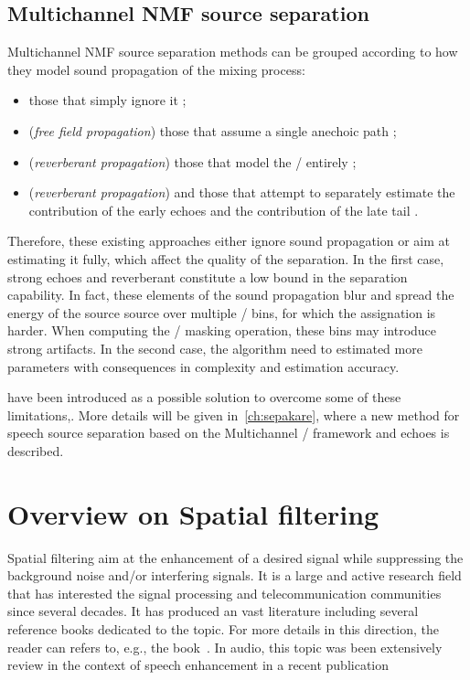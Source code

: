 \subsection{Multichannel NMF source separation}
Multichannel NMF source separation methods can be grouped according to how they model sound propagation of the mixing process:
\begin{itemize}
    \item those that simply ignore it ;
    \item (\textit{free field propagation}) those that assume a single anechoic path  ;
    \item (\textit{reverberant propagation}) those that model the \RTFs/ entirely ;
    \item (\textit{reverberant propagation}) and those that attempt to separately estimate the contribution of the early echoes and the contribution of the late tail .
\end{itemize}
Therefore, these existing approaches either ignore sound propagation or aim at estimating it fully, which affect the quality of the separation.
In the first case, strong echoes and reverberant constitute a low bound in the separation capability.
In fact, these elements of the sound propagation blur and spread the energy of the source source over multiple \TF/ bins, for which the assignation is harder.
When computing the \TF/ masking operation, these bins may introduce strong artifacts.
In the second case, the algorithm need to estimated more parameters with consequences in complexity and estimation accuracy.

 have been introduced as a possible solution to overcome some of these limitations,.
More details will be given in~\cref{ch:sepakare}, where a new method for speech source separation based on the Multichannel \NMF/ framework and echoes is described.

\section{Overview on Spatial filtering}\label{subsec:application:filtering}
Spatial filtering aim at the enhancement of a desired signal while suppressing the background noise and/or interfering signals.
It is a large and active research field that has interested the signal processing and telecommunication communities since several decades.
It has produced an vast literature including several reference books dedicated to the topic.
For more details in this direction, the reader can refers to, e.g., the book~.
In audio, this topic was been extensively review in the context of speech enhancement in a recent publication~

